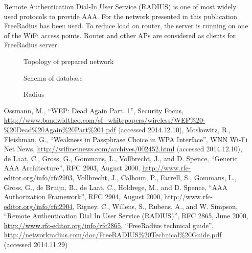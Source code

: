\documentclass{llncs}
\begin{document}
Remote Authentication Dial-In User Service (RADIUS) \cite{rfc2865} is one of
most widely used protocols to provide AAA. For the network presented in this
publication FreeRadius \cite{freeRadius} has been used. To reduce load on
router, the server is running on one of the WiFi access points. Router and other
APs are considered as clients for FreeRadius server. 

\begin{figure}
\vspace{-15pt}
\caption{Topology of prepared network}
\end{figure}

\begin{figure}
\vspace{-15pt}
\caption{Schema of database}
\end{figure}

\begin{figure}
\vspace{-15pt}
\caption{Radius}
\end{figure}

%
%
\begin{thebibliography}{}
%
Ossmann, M., ``WEP: Dead Again Part. 1'', Security Focus, 
\url{http://www.bandwidthco.com/sf_whitepapers/wireless/WEP%20-%20Dead%20Again%20Part%201.pdf}
(accessed 2014.12.10),
Moskowitz, R., Fleishman, G., ``Weakness in Passphrase Choice in WPA Interface'',
WNN Wi-Fi Net News, \url{http://wifinetnews.com/archives/002452.html} (accessed
2014.12.10),
de Laat, C., Gross, G., Gommans, L., Vollbrecht, J., and D. Spence, ``Generic AAA
Architecture'', RFC 2903, August 2000,
\url{http://www.rfc-editor.org/info/rfc2903},
Vollbrecht, J., Calhoun, P., Farrell, S., Gommans, L., Gross, G., de Bruijn, B.,
de Laat, C., Holdrege, M., and D. Spence, ``AAA Authorization Framework'', RFC
2904, August 2000, \url{http://www.rfc-editor.org/info/rfc2904},
Rigney, C., Willens, S., Rubens, A., and W. Simpson, ``Remote  Authentication
Dial In User Service (RADIUS)'', RFC 2865, June 2000,
\url{http://www.rfc-editor.org/info/rfc2865},
``FreeRadius technical guide'',
\url{http://networkradius.com/doc/FreeRADIUS%20Technical%20Guide.pdf} (accessed 2014.11.29)
\end{thebibliography}


\clearpage
{} %
\renewcommand{\indexname}{Author Index}
\printindex
\clearpage
{} %
\renewcommand{\indexname}{Subject Index}

\end{document}

